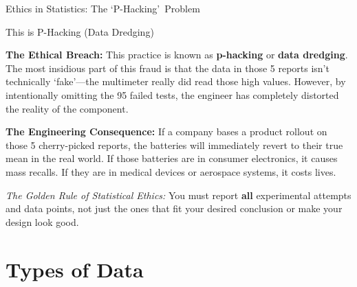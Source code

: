 \begin{frame}[allowframebreaks]{Ethics in Statistics: The \lq P-Hacking\rq\ Problem}
\begin{block}{This is P-Hacking (Data Dredging)}
{            \vspace{0.2cm}
            \textbf{The Ethical Breach:} This practice is known as \textbf{p-hacking} or \textbf{data dredging}. The most insidious part of this fraud is that the data in those 5 reports isn't technically \lq fake\rq—the multimeter really did read those high values. However, by intentionally omitting the 95 failed tests, the engineer has completely distorted the reality of the component.
            
            \vspace{0.2cm}
            \textbf{The Engineering Consequence:} If a company bases a product rollout on those 5 cherry-picked reports, the batteries will immediately revert to their true mean in the real world. If those batteries are in consumer electronics, it causes mass recalls. If they are in medical devices or aerospace systems, it costs lives. 
            
            \vspace{0.2cm}
            \textit{The Golden Rule of Statistical Ethics:} You must report \textbf{all} experimental attempts and data points, not just the ones that fit your desired conclusion or make your design look good.
        }
    \end{block}
     
                
\end{frame}

\section{Types of Data}


